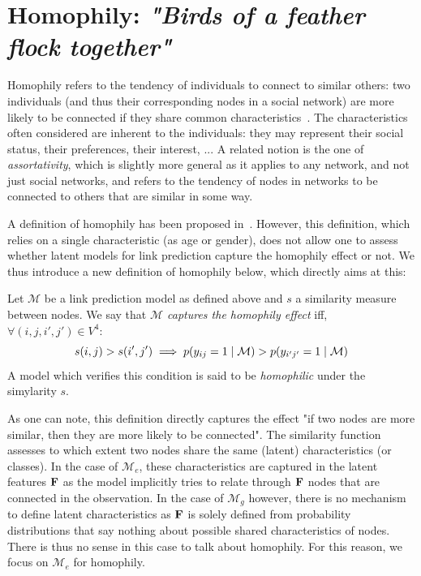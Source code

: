 \section{Homophily: \emph{"Birds of a feather flock together"}}
\label{sec:homophily}

Homophily refers to the tendency of individuals to connect to similar others: two individuals (and thus their corresponding nodes in a social network) are more likely to be connected if they share common characteristics~\cite{mcpherson2001birds,lazarsfeld1954friendship}. The characteristics often considered are inherent to the individuals: they may represent their social status, their preferences, their interest, ... A related notion is the one of {\it assortativity}, which is slightly more general as it applies to any network, and not just social networks, and refers to the tendency of nodes in networks to be connected to others that are similar in some way.

A definition of homophily has been proposed in~\cite{la2010randomization}. However, this definition, which relies on a single characteristic (as age or gender), does not allow one to assess whether latent models for link prediction capture the homophily effect or not. We thus introduce a new definition of homophily below, which directly aims at this:
%
\begin{definition}[Homophily]
	Let $\mathcal{M}$ be a link prediction model as defined above and $s$ a similarity measure between nodes. We say that \emph{$\mathcal{M}$ captures the homophily effect} iff, $\forall (i,j,i',j') \in V^4$:
%
\begin{equation}
s(i,j) > s(i',j')  \implies p(y_{ij}=1 \mid \mathcal{M}) > p(y_{i'j'}=1  \mid \mathcal{M}) \nonumber
\end{equation}
%
A model which verifies this condition is said to be \emph{homophilic} under the simylarity $s$.
\end{definition}
%
As one can note, this definition directly captures the effect "if two nodes are more similar, then they are more likely to be connected". The similarity function assesses to which extent two nodes share the same (latent) characteristics (or classes). In the case of $\mathcal{M}_e$, these characteristics are captured in the latent features $\mathbf{F}$ as the model implicitly tries to relate through $\mathbf{F}$ nodes that are connected in the observation. In the case of $\mathcal{M}_g$ however, there is no mechanism to define latent characteristics as $\mathbf{F}$ is solely defined from probability distributions that say nothing about possible shared characteristics of nodes. There is thus no sense in this case to talk about homophily. For this reason, we focus on $\mathcal{M}_e$ for homophily. 

